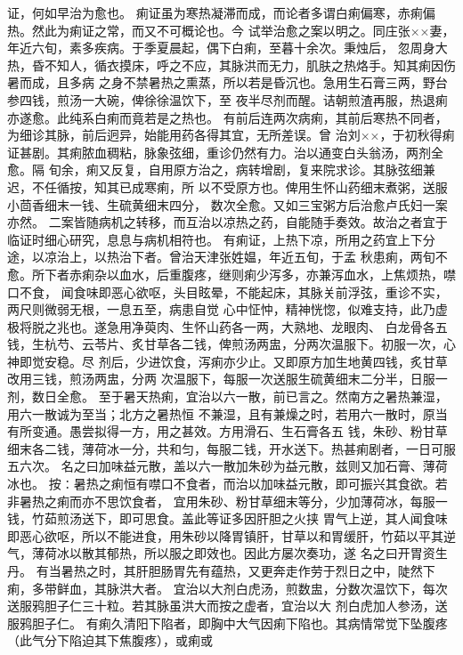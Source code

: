 \documentclass[a4paper,12pt,UTF8,twoside]{ctexbook}
\begin{document}
证，何如早治为愈也。 
痢证虽为寒热凝滞而成，而论者多谓白痢偏寒，赤痢偏热。然此为痢证之常，而又不可概论也。今 
试举治愈之案以明之。同庄张××妻，年近六旬，素多疾病。于季夏晨起，偶下白痢，至暮十余次。秉烛后， 
忽周身大热，昏不知人，循衣摸床，呼之不应，其脉洪而无力，肌肤之热烙手。知其痢因伤暑而成，且多病 
之身不禁暑热之熏蒸，所以若是昏沉也。急用生石膏三两，野台参四钱，煎汤一大碗，俾徐徐温饮下，至 
夜半尽剂而醒。诘朝煎渣再服，热退痢亦遂愈。此纯系白痢而竟若是之热也。 
有前后连两次病痢，其前后寒热不同者，为细诊其脉，前后迥异，始能用药各得其宜，无所差误。曾 
治刘××，于初秋得痢证甚剧。其痢脓血稠粘，脉象弦细，重诊仍然有力。治以通变白头翁汤，两剂全愈。隔 
旬余，痢又反复，自用原方治之，病转增剧，复来院求诊。其脉弦细兼迟，不任循按，知其已成寒痢，所 
以不受原方也。俾用生怀山药细末煮粥，送服小茴香细末一钱、生硫黄细末四分， 
数次全愈。又如三宝粥方后治愈卢氏妇一案亦然。 
二案皆随病机之转移，而互治以凉热之药，自能随手奏效。故治之者宜于临证时细心研究，息息与病机相符也。 
有痢证，上热下凉，所用之药宜上下分途，以凉治上，以热治下者。曾治天津张姓媪，年近五旬，于孟 
秋患痢，两旬不愈。所下者赤痢杂以血水，后重腹疼，继则痢少泻多，亦兼泻血水，上焦烦热，噤口不食， 
闻食味即恶心欲呕，头目眩晕，不能起床，其脉关前浮弦，重诊不实，两尺则微弱无根，一息五至，病患自觉 
心中怔忡，精神恍惚，似难支持，此乃虚极将脱之兆也。遂急用净萸肉、生怀山药各一两，大熟地、龙眼肉、 
白龙骨各五钱，生杭芍、云苓片、炙甘草各二钱，俾煎汤两盅，分两次温服下。初服一次，心神即觉安稳。尽 
剂后，少进饮食，泻痢亦少止。又即原方加生地黄四钱，炙甘草改用三钱，煎汤两盅，分两 
次温服下，每服一次送服生硫黄细末二分半，日服一剂，数日全愈。 
至于暑天热痢，宜治以六一散，前已言之。然南方之暑热兼湿，用六一散诚为至当；北方之暑热恒 
不兼湿，且有兼燥之时，若用六一散时，原当有所变通。愚尝拟得一方，用之甚效。方用滑石、生石膏各五 
钱，朱砂、粉甘草细末各二钱，薄荷冰一分，共和匀，每服二钱，开水送下。热甚痢剧者，一日可服五六次。 
名之曰加味益元散，盖以六一散加朱砂为益元散，兹则又加石膏、薄荷冰也。 
按∶暑热之痢恒有噤口不食者，而治以加味益元散，即可振兴其食欲。若非暑热之痢而亦不思饮食者， 
宜用朱砂、粉甘草细末等分，少加薄荷冰，每服一钱，竹茹煎汤送下，即可思食。盖此等证多因肝胆之火挟 
胃气上逆，其人闻食味即恶心欲呕，所以不能进食，用朱砂以降胃镇肝，甘草以和胃缓肝，竹茹以平其逆 
气，薄荷冰以散其郁热，所以服之即效也。因此方屡次奏功，遂 
名之曰开胃资生丹。 
有当暑热之时，其肝胆肠胃先有蕴热，又更奔走作劳于烈日之中，陡然下痢，多带鲜血，其脉洪大者。 
宜治以大剂白虎汤，煎数盅，分数次温饮下，每次送服鸦胆子仁三十粒。若其脉虽洪大而按之虚者，宜治以大 
剂白虎加人参汤，送服鸦胆子仁。 
有痢久清阳下陷者，即胸中大气因痢下陷也。其病情常觉下坠腹疼（此气分下陷迫其下焦腹疼），或痢或 
\end{document}
